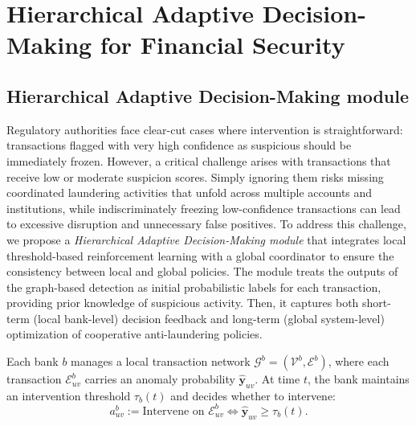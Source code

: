 \documentclass[11pt,english]{article}
\renewcommand{\hat}{\widehat}
\begin{document}
\section{Hierarchical Adaptive Decision-Making for Financial Security}
\subsection{Hierarchical Adaptive Decision-Making module}
Regulatory authorities face clear-cut cases where intervention is straightforward: transactions flagged with very high confidence as suspicious should be immediately frozen. However, a critical challenge arises with transactions that receive low or moderate suspicion scores. Simply ignoring them risks missing coordinated laundering activities that unfold across multiple accounts and institutions, while indiscriminately freezing low-confidence transactions can lead to excessive disruption and unnecessary false positives. To address this challenge, we propose a \emph{Hierarchical Adaptive Decision-Making module} that integrates local threshold-based reinforcement learning with a global coordinator to ensure the consistency between local and global policies. The module treats the outputs of the graph-based detection as initial probabilistic labels for each transaction, providing prior knowledge of suspicious activity. Then, it captures both short-term (local bank-level) decision feedback and long-term (global system-level) optimization of cooperative anti-laundering policies.

Each bank $b$ manages a local transaction network $\mathcal{G}^b=(\mathcal{V}^b,\mathcal{E}^b)$, where each transaction $\mathcal{E}_{uv}^b$ carries an anomaly probability $\hat{\mathbf{y}}_{uv}$.  
At time $t$, the bank maintains an intervention threshold $\tau_b(t)$ and decides whether to intervene:
\begin{equation}
    a_{uv}^b:= \text{Intervene on } \mathcal{E}_{uv}^b \iff \hat{\mathbf{y}}_{uv} \geq \tau_b(t).
\end{equation}
\end{document}
